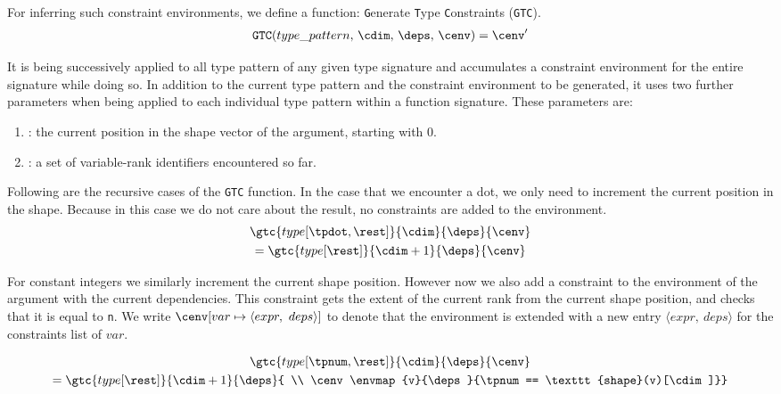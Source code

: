 \noindent
For inferring such constraint environments, we define a function: \texttt{G}enerate \texttt{T}ype \texttt{C}onstraints (\texttt{GTC}).
\begin{gather*}
    \texttt{GTC}(type\_pattern,\, \cdim,\, \deps,\, \cenv) = \cenv'
\end{gather*}

\noindent
It is being successively applied to all type pattern of any given type signature and accumulates a constraint environment \cenv{} for the entire signature
while doing so.
In addition to the current type pattern and the constraint environment to be generated,
it uses two further parameters when 
being applied to each individual type pattern within a function signature.
These parameters are:
\begin{enumerate}
    \item \cdim{}: the current position in the shape vector of the argument, starting with 0.
    \item \deps{}: a set of variable-rank identifiers encountered so far.
\end{enumerate}

\noindent
Following are the recursive cases of the \texttt{GTC} function.
In the case that we encounter a dot, we only need to increment the current position in the shape.
Because in this case we do not care about the result, no constraints are added to the environment.
\begin{gather*}
    \gtc{type[\tpdot,\rest]}{\cdim}{\deps}{\cenv} \\
        = \gtc{type[\rest]}{\cdim+1}{\deps}{\cenv}
\end{gather*}

\noindent
For constant integers \tpnum{} we similarly increment the current shape position.
However now we also add a constraint to the environment of the argument with the current dependencies.
This constraint gets the extent of the current rank from the current shape position, and checks that it is equal to \texttt{n}.
We write $\cenv[var \mapsto \langle{}expr,\ deps\rangle{}]$ to denote that the environment \cenv{} is extended with a new entry $\langle{}expr,\ deps\rangle{}$ for the constraints list of $var$.

{
\setlength\abovedisplayskip{0pt}
\begin{gather*}
    \gtc{type[\tpnum,\rest]}{\cdim}{\deps}{\cenv} \\
        = \gtc{type[\rest]}{\cdim+1}{\deps}{ \\ \cenv
            \envmap{v}{\deps}{\tpnum == \texttt{shape}(v)[\cdim]}}
\end{gather*}
}

